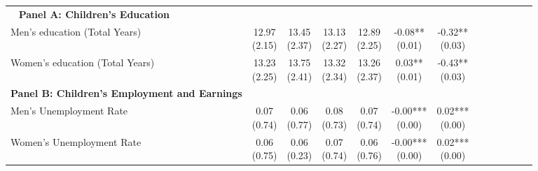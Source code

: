 \begin{landscape}
\begin{ThreePartTable}
\begin{longtable}[t]{>{\raggedright\arraybackslash}p{5cm}cccccc}
\midrule
\endhead
\midrule
\multicolumn{7}{r@{}}{\textit{(Continued on Next Page...)}}\
\endfoot
\bottomrule
\insertTableNotes
\endlastfoot
\textbf{Panel A: Children's Education} & \textbf{} & \textbf{} & \textbf{} & \textbf{} & \textbf{} & \textbf{}\\
\hspace{1em}Men’s education (Total Years) & \specialcell{12.97\\(2.15)} & \specialcell{13.45\\(2.37)} & \specialcell{13.13\\(2.27)} & \specialcell{12.89\\(2.25)} & \specialcell{-0.08**\\(0.01)} & \specialcell{-0.32**\\(0.03)}\\
\hspace{1em}Women’s education (Total Years) & \specialcell{13.23\\(2.25)} & \specialcell{13.75\\(2.41)} & \specialcell{13.32\\(2.34)} & \specialcell{13.26\\(2.37)} & \specialcell{0.03**\\(0.01)} & \specialcell{-0.43**\\(0.03)}\\
\textbf{Panel B: Children's Employment and Earnings} & \textbf{} & \textbf{} & \textbf{} & \textbf{} & \textbf{} & \textbf{}\\
\hspace{1em}Men’s Unemployment Rate & \specialcell{0.07\\(0.74)} & \specialcell{0.06\\(0.77)} & \specialcell{0.08\\(0.73)} & \specialcell{0.07\\(0.74)} & \specialcell{-0.00***\\(0.00)} & \specialcell{0.02***\\(0.00)}\\
\addlinespace
\hspace{1em}Women’s Unemployment Rate & \specialcell{0.06\\(0.75)} & \specialcell{0.06\\(0.23)} & \specialcell{0.07\\(0.74)} & \specialcell{0.06\\(0.76)} & \specialcell{-0.00***\\(0.00)} & \specialcell{0.02***\\(0.00)}\\

\end{longtable}
\end{ThreePartTable}
\end{landscape}
